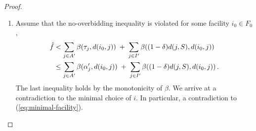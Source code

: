 \begin{proof}
\begin{enumerate}
\begin{align*}
        &\geq (1+\eps^2) \theta - (\gamma (1-\delta/2) + \eps)d(i,j)\\
        &\geq (1+\eps^2)\theta - \gamma d(i, j)\\
        &\geq \alpha_j' - \gamma d(i, j)\,.
    \end{align*}
        For $j \in A' \setminus B(i,\epsilon \theta)$, using that $\eps^2 \theta \le \epsilon \gamma \delta /2~\theta \le \gamma \delta/2~ d(i,j)$,
        \begin{align*}
            \beta(\alpha_j^\prime, d(i,j)) = \pos{\alpha_j^\prime - \gamma  d(i,j)} \le \pos{\theta - \gamma (1-\delta/2) d(i,j)} = \beta(\tau_j,  (1-\delta/2) d(i,j))\,.
        \end{align*}
        \item[\textbf{(iv)}] Assume that the no-overbidding inequality is violated for some facility $i_0 \in F_0$,
        \begin{align*}
            \hat f & < \sum_{j\in A'}\beta(\tau_j,d(i_0,j))
                  \;+\;
                  \sum_{j\in I'}\beta((1-\delta)  d(j,S), d(i_0,j))
                  \\ & \le \sum_{j\in A'} \beta(\alpha^\prime_j,d(i_0,j))
                  \;+\;
                  \sum_{j\in I'}\beta((1-\delta)  d(j,S), d(i_0,j))\,.
        \end{align*}
        The last inequality holds by the monotonicity of $\beta$.
        We arrive at a contradiction to the minimal choice of $i$. In particular, a contradiction to (\ref{eq:minimal-facility}). 
        

\end{enumerate}
\end{proof}
